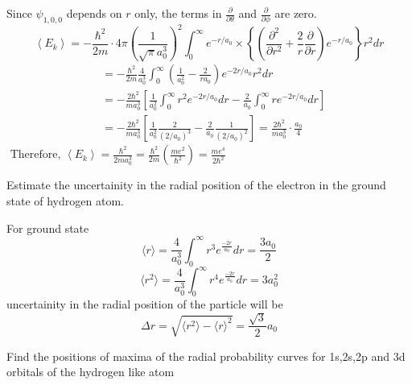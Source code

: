 \begin{enumerate}
\begin{answer}
		Since $\psi_{1,0,0}$ depends on $r$ only, the terms in $\frac{\partial}{\partial \theta}$ and $\frac{\partial}{\partial \phi}$ are zero.\\
		$$\left\langle E_{k}\right\rangle=-\frac{\hbar^{2}}{2 m} \cdot 4 \pi\left(\frac{1}{\sqrt{\pi} a_{0}^{3}}\right)^{2} \int_{0}^{\infty} e^{-r / a_{0}} \times\left\{\left(\frac{\partial^{2}}{\partial r^{2}}+\frac{2}{r} \frac{\partial}{\partial r}\right) e^{-r / a_{0}}\right\} r^{2} d r$$
		$$\begin{aligned}
		&=-\frac{\hbar^{2}}{2 m} \frac{4}{a_{0}^{3}} \int_{0}^{\infty}\left(\frac{1}{a_{0}^{2}}-\frac{2}{r a_{0}}\right) e^{-2 r / a_{0}} r^{2} d r \\
		&=-\frac{2 \hbar^{2}}{m a_{0}^{3}}\left[\frac{1}{a_{0}^{2}} \int_{0}^{\infty} r^{2} e^{-2 r / a_{0}} d r-\frac{2}{a_{0}} \int_{0}^{\infty} r e^{-2 r / a_{0}} d r\right] \\
		&=-\frac{2 \hbar^{2}}{m a_{0}^{3}}\left[\frac{1}{a_{0}^{2}} \frac{2}{\left(2 / a_{0}\right)^{3}}-\frac{2}{a_{0}} \frac{1}{\left(2 / a_{0}\right)^{2}}\right]=\frac{2 \hbar^{2}}{m a_{0}^{3}} \cdot \frac{a_{0}}{4}
		\end{aligned}$$
		$\text { Therefore, }\left\langle E_{k}\right\rangle=\frac{\hbar^{2}}{2 m a_{0}^{3}}=\frac{\hbar^{2}}{2 m}\left(\frac{m e^{2}}{\hbar^{2}}\right)=\frac{m e^{4}}{2 \hbar^{2}}$
	\end{answer}
	\begin{minipage}{\textwidth}
	\item Estimate the uncertainity in the radial position of the electron in the ground state of hydrogen atom.
\end{minipage}
	\begin{answer}
		For ground state\\
		$$\langle r \rangle =\frac{4}{a_0^3}	\int_{0}^{\infty} r^3 e^{\frac{-2r}{a_0}}dr=\frac{3a_0}{2}$$
		$$\langle r^2 \rangle =\frac{4}{a_0^3}	\int_{0}^{\infty} r^4 e^{\frac{-2r}{a_0}}dr=3a_0^2$$
		uncertainity in the radial position of the particle will be \\
		$$\Delta r=\sqrt{\langle r^2 \rangle-\langle r \rangle^2}=\frac{\sqrt{3}}{2}a_0$$
	\end{answer}
	\begin{minipage}{\textwidth}
	\item 	Find the positions of maxima of the radial probability curves for 1s,2s,2p and 3d orbitals of the hydrogen like atom 
\end{minipage}
	\begin{answer}

\end{answer}
\end{enumerate}
